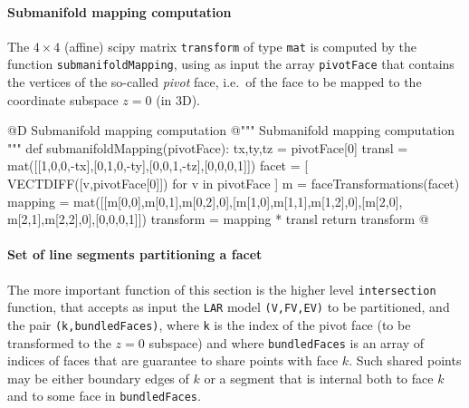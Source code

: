 \documentclass[11pt,oneside]{article}    %
\begin{document}
\paragraph{Submanifold mapping computation}
The $4\times 4$ (affine) scipy matrix \texttt{transform} of type \texttt{mat} is computed by the function \texttt{submanifoldMapping}, using as input the array \texttt{pivotFace} that contains the vertices of the so-called \emph{pivot} face, i.e.~of the face to be mapped to the coordinate subspace $z=0$ (in 3D).

@D Submanifold mapping computation
@{""" Submanifold mapping computation """
def submanifoldMapping(pivotFace):
    tx,ty,tz = pivotFace[0]
    transl = mat([[1,0,0,-tx],[0,1,0,-ty],[0,0,1,-tz],[0,0,0,1]])
    facet = [ VECTDIFF([v,pivotFace[0]]) for v in pivotFace ]
    m = faceTransformations(facet)
    mapping = mat([[m[0,0],m[0,1],m[0,2],0],[m[1,0],m[1,1],m[1,2],0],[m[2,0],
                    m[2,1],m[2,2],0],[0,0,0,1]])
    transform = mapping * transl
    return transform
@}

\paragraph{Set of line segments partitioning a facet}
The more important function of this section is the higher level \texttt{intersection} function, that accepts as input the \texttt{LAR} model \texttt{(V,FV,EV)} to be partitioned, and the pair \texttt{(k,bundledFaces)}, where \texttt{k} is the index of the pivot face (to be transformed to the $z=0$ subspace) and where \texttt{bundledFaces} is an array of indices of faces that are guarantee to share points with face $k$. Such shared points may be either boundary edges of $k$ or a segment that is internal both to face $k$ and to some face in  \texttt{bundledFaces}.
\end{document}
